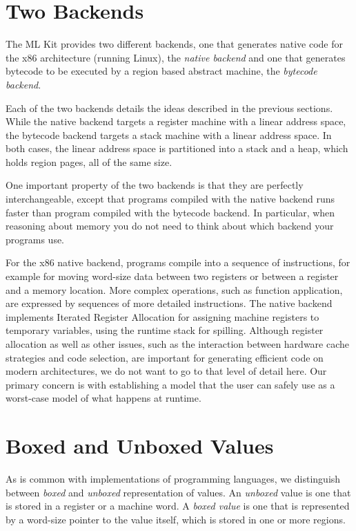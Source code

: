 \documentclass[12pt]{book}
\begin{document}

\section{Two Backends}
%
%
The ML Kit provides two different backends, one that generates native
code for the x86 architecture (running Linux), the {\em native
  backend\/} and one that generates bytecode to be executed by a
region based abstract machine, the {\em bytecode backend}.

Each of the two backends details the ideas described in the previous
sections. While the native backend targets a register machine with a
linear address space, the bytecode backend targets a stack machine
with a linear address space. In both cases, the linear address space
is partitioned into a stack and a heap, which holds region pages, all
of the same size.

One important property of the two backends is that they are perfectly
interchangeable, except that programs compiled with the native backend
runs faster than program compiled with the bytecode backend. In
particular, when reasoning about memory you do not need to think about
which backend your programs use.

For the x86 native backend, programs compile into a sequence of
instructions, for example for moving word-size data between two
registers or between a register and a memory location.  More complex
operations, such as function application, are expressed by sequences
of more detailed instructions. The native backend implements Iterated
Register Allocation \cite{appel96} for assigning machine registers to
temporary variables, using the runtime stack for spilling.  Although
register allocation as well as other issues, such as the interaction
between hardware cache strategies and code selection, are important
for generating efficient code on modern architectures, we do not 
want to go to that level of detail here. Our primary concern is with
establishing a model that the user can safely use as a worst-case
model of what happens at runtime.

\section{Boxed and Unboxed Values}
\label{boxing.sec}
%
%
%
As is common with implementations of programming languages, we
distinguish between {\em boxed\/} and {\em unboxed\/} representation
of values.  An {\em unboxed\/} value is one that is stored in a
register or a machine word. A {\em boxed value\/} is one that is
represented by a word-size pointer to the value itself, which is
stored in one or more regions.
\end{document}
